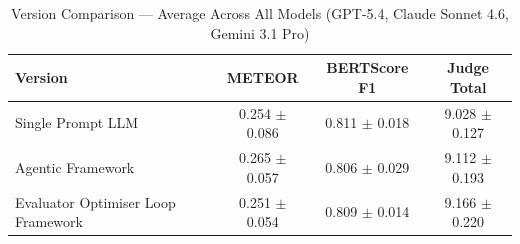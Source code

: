 \begin{table}[htbp]
\centering
\caption{Version Comparison — Average Across All Models (GPT-5.4, Claude Sonnet 4.6, Gemini 3.1 Pro)}
\label{tab:version_avg_all_models}
\begin{tabular}{lccc}
\toprule
Version & METEOR & BERTScore F1 & Judge Total \\
\midrule
Single Prompt LLM & 0.254 $\pm$ 0.086 & 0.811 $\pm$ 0.018 & 9.028 $\pm$ 0.127 \\
Agentic Framework & 0.265 $\pm$ 0.057 & 0.806 $\pm$ 0.029 & 9.112 $\pm$ 0.193 \\
Evaluator Optimiser Loop Framework & 0.251 $\pm$ 0.054 & 0.809 $\pm$ 0.014 & 9.166 $\pm$ 0.220 \\
\bottomrule
\end{tabular}
\end{table}